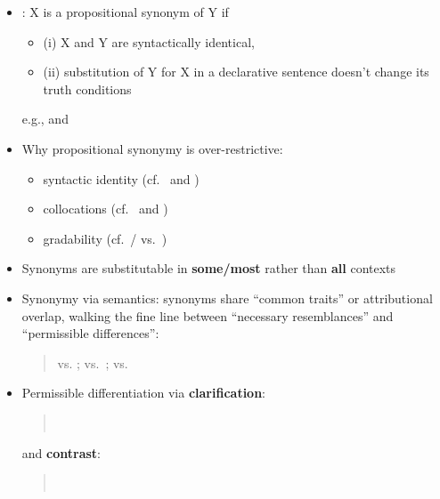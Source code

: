 \documentclass[a4paper,landscape,headrule,footrule,xetex]{foils}
\begin{document}
\begin{itemize}
\item {}: X is a propositional synonym of Y if
  \begin{itemize}
  \item   (i) X and Y are syntactically identical,
  \item (ii) substitution of Y  for X in a declarative sentence doesn't change its truth conditions
  \end{itemize}
  e.g.,  and 
\item Why propositional synonymy is over-restrictive:
  \begin{itemize}
  \item syntactic identity (cf.\  and )
  \item collocations (cf.\  and )
  \item gradability (cf.\ / vs.\ )
  \end{itemize}
\end{itemize}

\begin{itemize}
\item Synonyms are substitutable in \textbf{some/most} rather than \textbf{all} contexts
\item Synonymy via semantics: synonyms share ``common traits'' or
  attributional overlap, walking the fine line between ``necessary
  resemblances'' and ``permissible differences'':
  \begin{quote}
       vs. ;   vs.\ ;  vs. 
  \end{quote}
\item Permissible differentiation via \textbf{clarification}:
  \begin{quote}
    \\
  \end{quote}
  and \textbf{contrast}:
  \begin{quote}
    \\
  \end{quote}
\end{itemize}
\end{document}
